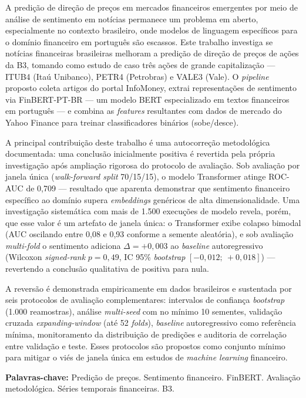 \imprimircapa

\imprimirfolhaderosto*


\begin{resumo}
A predição de direção de preços em mercados financeiros emergentes por meio de análise de sentimento em notícias permanece um problema em aberto, especialmente no contexto brasileiro, onde modelos de linguagem específicos para o domínio financeiro em português são escassos. Este trabalho investiga se notícias financeiras brasileiras melhoram a predição de direção de preços de ações da B3, tomando como estudo de caso três ações de grande capitalização --- ITUB4 (Itaú Unibanco), PETR4 (Petrobras) e VALE3 (Vale). O \textit{pipeline} proposto coleta artigos do portal InfoMoney, extrai representações de sentimento via FinBERT-PT-BR --- um modelo BERT especializado em textos financeiros em português \cite{souza2023} --- e combina as \textit{features} resultantes com dados de mercado do Yahoo Finance para treinar classificadores binários (sobe/desce).

A principal contribuição deste trabalho é uma autocorreção metodológica documentada: uma conclusão inicialmente positiva é revertida pela própria investigação após ampliação rigorosa do protocolo de avaliação. Sob avaliação por janela única (\textit{walk-forward split} 70/15/15), o modelo Transformer \cite{vaswani2017} atinge ROC-AUC de 0,709 --- resultado que aparenta demonstrar que sentimento financeiro específico ao domínio supera \textit{embeddings} genéricos de alta dimensionalidade. Uma investigação sistemática com mais de 1.500 execuções de modelo revela, porém, que esse valor é um artefato de janela única: o Transformer exibe colapso bimodal (AUC oscilando entre 0,08 e 0,93 conforme a semente aleatória), e sob avaliação \textit{multi-fold} o sentimento adiciona $\Delta = +0{,}003$ ao \textit{baseline} autoregressivo (Wilcoxon \textit{signed-rank} $p = 0{,}49$, IC 95\% \textit{bootstrap} $[-0{,}012;\ +0{,}018]$) --- revertendo a conclusão qualitativa de positiva para nula.

A reversão é demonstrada empiricamente em dados brasileiros e sustentada por seis protocolos de avaliação complementares: intervalos de confiança \textit{bootstrap} (1.000 reamostras), análise \textit{multi-seed} com no mínimo 10 sementes, validação cruzada \textit{expanding-window} (até 52 \textit{folds}), \textit{baseline} autoregressivo como referência mínima, monitoramento da distribuição de predições e auditoria de correlação entre validação e teste. Esses protocolos são propostos como conjunto mínimo para mitigar o viés de janela única em estudos de \textit{machine learning} financeiro.

\textbf{Palavras-chave:} Predição de preços. Sentimento financeiro. FinBERT. Avaliação metodológica. Séries temporais financeiras. B3.
\end{resumo}

